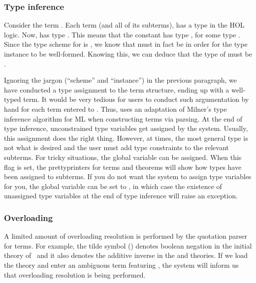 {\subsubsection{Type inference}

Consider the term .  Each term (and all of its subterms),
has a type in the HOL logic. Now,  has type . This
means that the constant \holtxt{=} has type ,
for some type . Since the type scheme for \holtxt{=} is
, we know that  must in fact be
 in order for the type instance to be well-formed. Knowing
this, we can deduce that the type of  must be .

Ignoring the jargon (``scheme'' and ``instance'') in the previous
paragraph, we have conducted a type assignment to the term structure,
ending up with a well-typed term. It would be very tedious for users
to conduct such argumentation by hand for each term entered to \HOL{}.
Thus, \HOL{} uses an adaptation of Milner's type inference algorithm
for ML when constructing terms via parsing. At the end of type
inference, unconstrained type variables get assigned by the system.
Usually, this assignment does the right thing. However, at times, the
most general type is not what is desired and the user must add type
constraints to the relevant subterms. For tricky situations, the
global variable  can be assigned. When this flag is
set, the prettyprinters for terms and theorems will show how types
have been assigned to subterms. If you do not want the system to
assign type variables for you, the global variable
 can be set to , in which case the
existence of unassigned type variables at the end of type inference
will raise an exception.

\subsubsection{Overloading}

A limited amount of overloading resolution is performed by the quotation
parser for terms. For example, the tilde symbol (\holtxt{\~{}})
denotes boolean negation in the initial theory of \HOL\, and it also denotes
the additive inverse in the  and
 theories. If we load the 
theory and enter an ambiguous term featuring \holtxt{\~{}}, the
system will inform us that overloading resolution is being performed.

}
